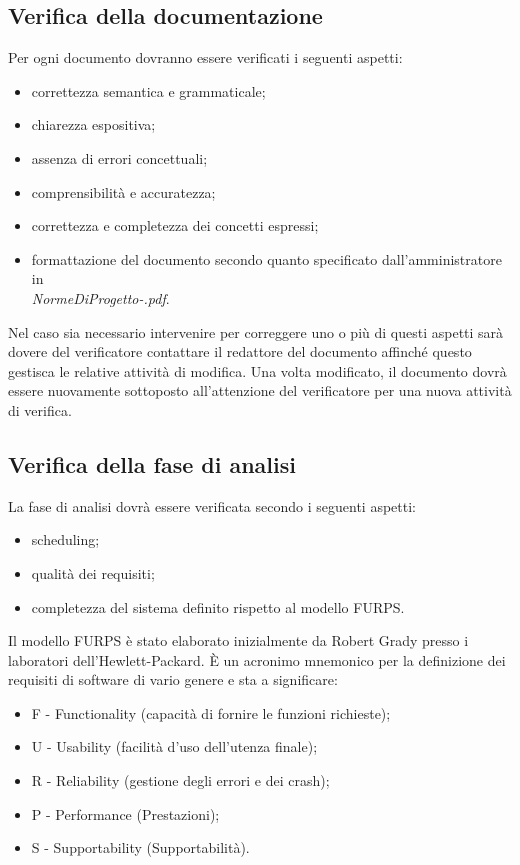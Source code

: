 \subsection{Verifica della documentazione}

Per ogni documento dovranno essere verificati i seguenti aspetti:
\begin{itemize}
\item correttezza semantica e grammaticale;
\item chiarezza espositiva;
\item assenza di errori concettuali;
\item comprensibilit\`a e accuratezza;
\item correttezza e completezza dei concetti espressi;
\item formattazione del documento secondo quanto specificato dall'amministratore
in\\ \emph{NormeDiProgetto-\versionenormeprogetto.pdf}.
\end{itemize}

Nel caso sia necessario intervenire per correggere uno o pi\`u di questi aspetti
sar\`a dovere del verificatore contattare il redattore del documento affinch\'e
questo gestisca le relative attivit\`a di modifica. Una volta modificato, il
documento dovr\`a essere nuovamente sottoposto all'attenzione del verificatore
per una nuova attivit\`a di verifica.


\subsection{Verifica della fase di analisi}

La fase di analisi dovr\`a essere verificata secondo i seguenti aspetti:

\begin{itemize}

\item scheduling;
\item qualit\`a dei requisiti;
\item completezza del sistema definito rispetto al modello FURPS.
 

\end{itemize}

Il modello FURPS \`e stato elaborato inizialmente da Robert Grady presso i
laboratori dell'Hewlett-Packard. \`E un acronimo mnemonico per la definizione dei requisiti
di software di vario genere e sta a significare:

\begin{itemize}

\item F - Functionality (capacit\`a di fornire le funzioni richieste);
\item U - Usability (facilit\`a d'uso dell'utenza finale);
\item R - Reliability (gestione degli errori e dei crash);
\item P - Performance (Prestazioni);
\item S - Supportability (Supportabilit\`a).
\end{itemize}


